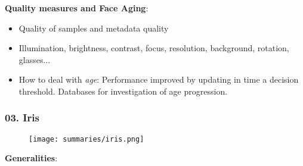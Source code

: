 \documentclass[a4paper]{article}
\begin{document}
      \textbf{Quality measures and Face Aging}:
      \begin{itemize}
        \item Quality of samples and metadata quality
        \item Illumination, brightness, contrast, focus, resolution, background, rotation, glasses...
        \item How to deal with \emph{age}: Performance improved by updating in time a decision threshold. Databases for investigation of age progression.
      \end{itemize}
      \newpage
    \subsubsection*{03. Iris}
      \begin{figure}[htp]
        \centering
          \texttt{[image: summaries/iris.png]}
      \end{figure}
      \textbf{Generalities}:
\end{document}
